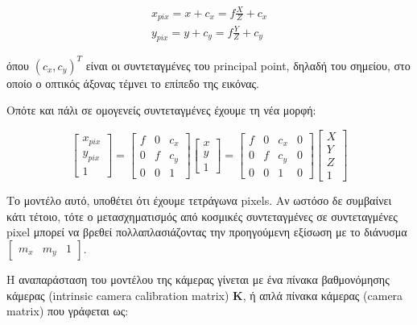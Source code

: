 \begin{equation}
\begin{aligned}
x_{pix}=x+c_{x}=f\frac{X}{Z}+c_{x}\\[0.3cm]
y_{pix}=y+c_{y}=f\frac{Y}{Z}+c_{y}
\end{aligned}
\end{equation}

όπου $(c_{x},c_{y})^{T}$ είναι οι συντεταγμένες του principal point, δηλαδή του σημείου, στο οποίο ο οπτικός άξονας τέμνει το επίπεδο της εικόνας. 

Οπότε και πάλι σε ομογενείς συντεταγμένες έχουμε τη νέα μορφή:

\begin{equation}
\begin{bmatrix}
x_{pix}\\y_{pix}\\1
\end{bmatrix}
=
\begin{bmatrix}
f & 0 & c_{x} \\
0 & f & c_{y} \\
0 & 0 & 1 
\end{bmatrix}
\begin{bmatrix}
x\\
y\\
1
\end{bmatrix}
=
\begin{bmatrix}
f & 0 & c_{x} & 0\\
0 & f & c_{y} & 0\\
0 & 0 & 1 & 0
\end{bmatrix}
\begin{bmatrix}
X\\
Y\\
Z\\
1
\end{bmatrix}
\end{equation}




Το μοντέλο αυτό, υποθέτει ότι έχουμε τετράγωνα pixels. Αν ωστόσο δε συμβαίνει κάτι τέτοιο, τότε ο μετασχηματισμός από κοσμικές συντεταγμένες σε συντεταγμένες pixel μπορεί να βρεθεί πολλαπλασιάζοντας την προηγούμενη εξίσωση με το διάνυσμα $\begin{bmatrix}m_{x} & m_{y} & 1\end{bmatrix}$. 


Η αναπαράσταση του μοντέλου της κάμερας γίνεται με ένα πίνακα βαθμονόμησης κάμερας (intrinsic camera calibration matrix) $\mathbf{K}$, ή απλά πίνακα κάμερας (camera matrix) που γράφεται ως:


